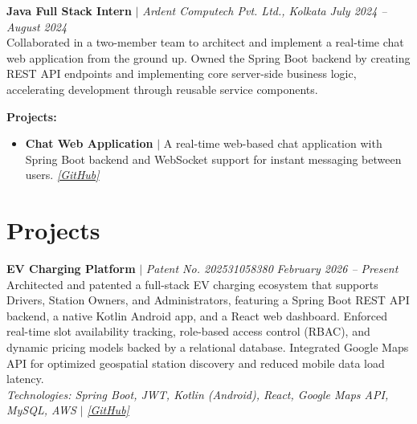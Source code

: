\documentclass[10pt, a4paper]{article}
\begin{document}
\vspace{6pt}

{\small\textbf{Java Full Stack Intern} $|$ \textit{Ardent Computech Pvt. Ltd., Kolkata} \hfill \textit{July 2024 -- August 2024}} \\[2pt]
{\small Collaborated in a two-member team to architect and implement a real-time chat web application from the ground up. Owned the Spring Boot backend by creating REST API endpoints and implementing core server-side business logic, accelerating development through reusable service components.}

\vspace{4pt}
{\small\textbf{Projects:}}
\begin{itemize}[leftmargin=*, itemsep=1pt, topsep=2pt]
  \item {\small\textbf{Chat Web Application} $|$ A real-time web-based chat application with Spring Boot backend and WebSocket support for instant messaging between users. \href{https://github.com/singhaganesh/chat-app-web.git}{\textit{[GitHub]}}}
\end{itemize}

\section{Projects}

\textbf{EV Charging Platform} $|$ \textit{Patent No. 202531058380} \hfill \textit{February 2026 -- Present} \\
\small Architected and patented a full-stack EV charging ecosystem that supports Drivers, Station Owners, and Administrators, featuring a Spring Boot REST API backend, a native Kotlin Android app, and a React web dashboard. Enforced real-time slot availability tracking, role-based access control (RBAC), and dynamic pricing models backed by a relational database. Integrated Google Maps API for optimized geospatial station discovery and reduced mobile data load latency. \\
\small\textit{Technologies: Spring Boot, JWT, Kotlin (Android), React, Google Maps API, MySQL, AWS} $|$ \href{https://github.com/singhaganesh/EV-Project.git}{\textit{[GitHub]}}

\vspace{6pt}
\end{document}

